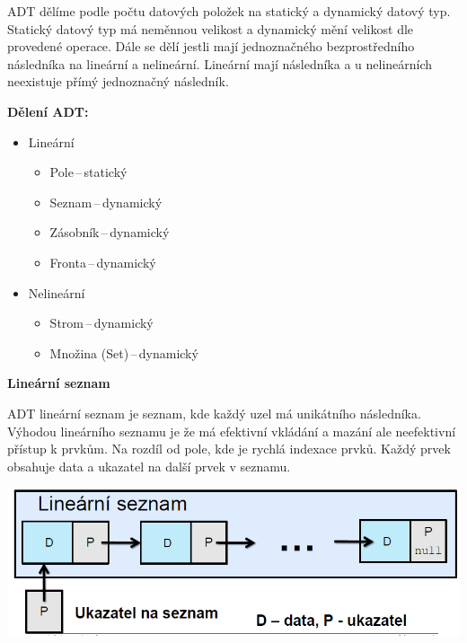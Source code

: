 ADT dělíme podle počtu datových položek na statický a dynamický datový typ. Statický datový typ má neměnnou velikost a dynamický mění velikost dle provedené operace. Dále se dělí jestli mají jednoznačného bezprostředního následníka na lineární a nelineární. Lineární mají následníka a u nelineárních neexistuje přímý jednoznačný následník.

\textbf{Dělení ADT:}
\begin{itemize}
    \item Lineární
    \begin{itemize}
        \item Pole\,--\,statický
        \item Seznam\,--\,dynamický
        \item Zásobník\,--\,dynamický
        \item Fronta\,--\,dynamický
    \end{itemize}
    \item Nelineární
    \begin{itemize}
        \item Strom\,--\,dynamický
        \item Množina (Set)\,--\,dynamický
    \end{itemize}
\end{itemize}

\begin{Large}\vspace{0,5cm} \textbf{Lineární seznam}
\end{Large}

ADT lineární seznam je seznam, kde každý uzel má unikátního následníka.
Výhodou lineárního seznamu je že má efektivní vkládání a mazání ale neefektivní přístup k prvkům. Na rozdíl od pole, kde je rychlá indexace prvků. Každý prvek obsahuje data a ukazatel na další prvek v seznamu.
\begin{center}
    \includegraphics[scale=0.5]{BPC-TIN/images/linsez.PNG}
\end{center}

